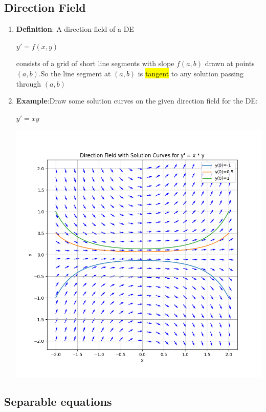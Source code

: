 \documentclass{article}
\begin{document}
  \subsection{Direction Field}
  \begin{enumerate}
    \item \textbf{Definition}: A direction field of a DE
      \begin{center}
        $y' = f(x,y)$
      \end{center}
    consists of a grid of short line segments with slope $f(a,b)$ drawn at points $(a,b)$.So the line segment at $(a,b)$ is \hl{tangent} to any solution passing through $(a,b)$

    \item \textbf{Example}:Draw some solution curves on the given direction field for the DE:
      \begin{center}
        $y' = xy$
      \end{center}
    \includegraphics[width=\linewidth]{Graphs/direction_field.png}
  \end{enumerate}

  \subsection{Separable equations}
\end{document}
